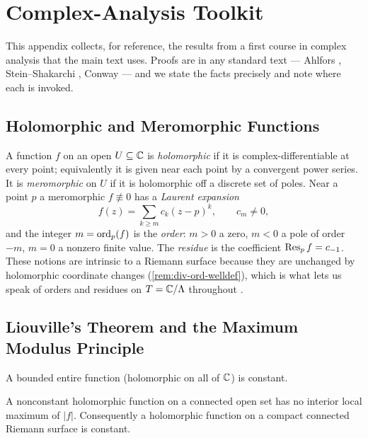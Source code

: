 \chapter{Complex-Analysis Toolkit}
\label{app:A}

This appendix collects, for reference, the results from a first course in complex
analysis that the main text uses. Proofs are in any standard text --- Ahlfors
\cite{ahlfors}, Stein--Shakarchi \cite{stein-shakarchi}, Conway \cite{conway} ---
and we state the facts precisely and note where each is invoked.

\section{Holomorphic and Meromorphic Functions}
\label{sec:A-holo}

A function \(f\) on an open \(U \subseteq \mathbb{C}\) is \emph{holomorphic} if it is
complex-differentiable at every point; equivalently it is given near each point by
a convergent power series. It is \emph{meromorphic} on \(U\) if it is holomorphic
off a discrete set of poles. Near a point \(p\) a meromorphic \(f \not\equiv 0\)
has a \emph{Laurent expansion}
\[
  f(z) = \sum_{k \ge m} c_k (z-p)^k, \qquad c_m \ne 0,
\]
and the integer \(m = \operatorname{ord}_p(f)\) is the \emph{order}: \(m > 0\) a zero, \(m < 0\)
a pole of order \(-m\), \(m = 0\) a nonzero finite value. The \emph{residue} is the
coefficient \(\operatorname{Res}_p f = c_{-1}\). These notions are intrinsic to a Riemann surface
because they are unchanged by holomorphic coordinate changes
(\cref{rem:div-ord-welldef}), which is what lets us speak of orders and residues on
\(T = \mathbb{C}/\Lambda\) throughout .

\section{Liouville's Theorem and the Maximum Modulus Principle}
\label{sec:A-liouville}

\begin{theorem}[Liouville]
\label{thm:A-liouville}
A bounded entire function (holomorphic on all of \(\mathbb{C}\)) is constant.
\end{theorem}

\begin{theorem}
\label{thm:A-maxmod}
A nonconstant holomorphic function on a connected open set has no interior local
maximum of \(|f|\). Consequently a holomorphic function on a compact connected
Riemann surface is constant.
\end{theorem}

